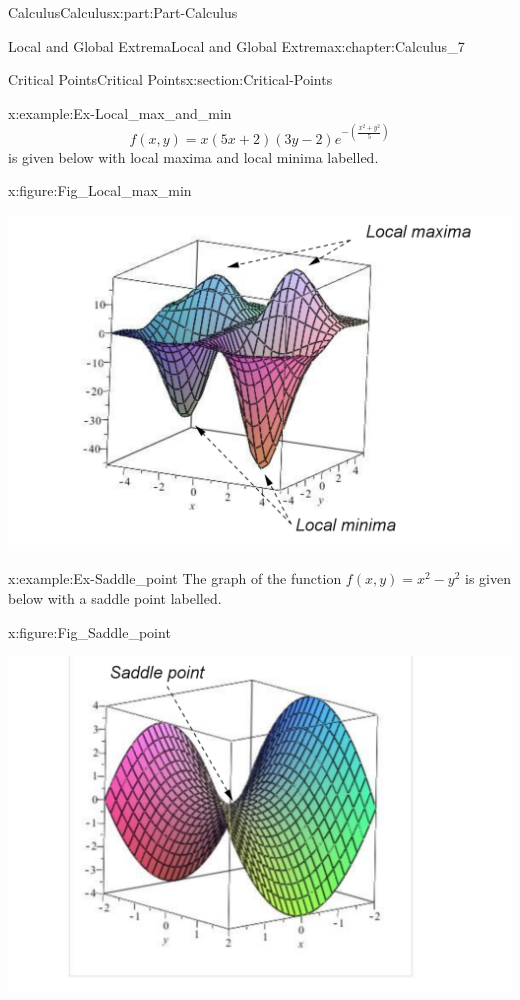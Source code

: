 \documentclass[oneside,10pt,]{book}
\numberwithin{equation}{section}
\begin{document}
\begin{partptx}{Calculus}{}{Calculus}{}{}{x:part:Part-Calculus}
\begin{chapterptx}{Local and Global Extrema}{}{Local and Global Extrema}{}{}{x:chapter:Calculus_7}
\begin{sectionptx}{Critical Points}{}{Critical Points}{}{}{x:section:Critical-Points}
\begin{example}{}{x:example:Ex-Local_max_and_min}
\begin{equation*}
f(x,y) = x(5x+2)(3y-2)e^{-\left( \frac{x^2+y^2}{5} \right)}
\end{equation*}
is given below with local maxima and local minima labelled.%
\begin{figureptx}{}{x:figure:Fig_Local_max_min}{}%
\begin{image}{0.05}{0.9}{0.05}%
\includegraphics[width=\linewidth]{./Calculus/Images/7/Fig2_Local_max_and_min.png}
\end{image}%
\tcblower
\end{figureptx}%
\end{example}
\begin{example}{}{x:example:Ex-Saddle_point}%
The graph of the function \(f(x,y) = x^2-y^2\) is given below with a saddle point labelled.%
\begin{figureptx}{}{x:figure:Fig_Saddle_point}{}%
\begin{image}{0.05}{0.9}{0.05}%
\includegraphics[width=\linewidth]{./Calculus/Images/7/Fig3_Saddle_point.png}

\end{image}
\end{figureptx}
\end{example}
\end{sectionptx}
\end{chapterptx}
\end{partptx}
\end{document}
